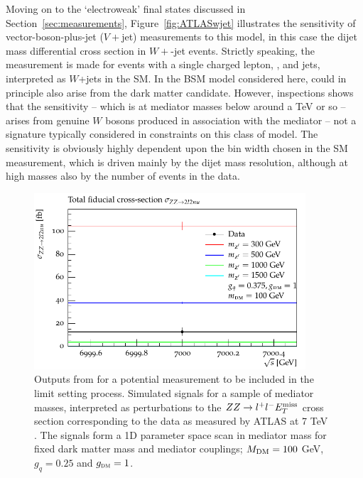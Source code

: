 \documentclass[floatfix]{article}
\begin{document}
Moving on to the `electroweak' final states discussed in Section~\ref{sec:measurements}, Figure~\ref{fig:ATLASwjet} illustrates the sensitivity of vector-boson-plus-jet
($V+$jet) measurements to this model, in this case the dijet mass differential cross section in $W+$-jet events. Strictly speaking, the measurement is made for
events with a single charged lepton, \MET, and jets, interpreted as $W$+jets in the SM. In the BSM model considered here, \MET could in principle 
also arise from the dark matter candidate. However, inspections shows that the sensitivity -- which is at mediator masses below around a TeV or so -- arises 
from genuine $W$ bosons produced in association with the mediator -- not a signature typically considered in constraints on this class of model. The sensitivity
is obviously highly dependent upon the bin width chosen in the SM measurement, which is driven mainly by the dijet mass resolution, although at high masses also by
the number of events in the data.

\begin{figure}
\centering
      \includegraphics[width=0.9\textwidth]{images/atlaszz/fullrange/ATLASZZ.pdf}
\caption{Outputs from \rivet for a potential measurement to be included in the limit setting process. Simulated signals for a 
sample of mediator masses, interpreted as perturbations to the $ZZ\rightarrow l^+l^- E_T^{\rm miss}$ cross section 
corresponding to the data as measured by ATLAS at 7 TeV~\cite{Aad:2012awa} \label{fig:ATLASzz}. The signals form a 1D parameter space scan in 
mediator mass \MZP for fixed dark matter mass and mediator couplings; $M_{\rm DM}=100$ GeV, $g_{q}=0.25$ and $g_{\textsc{dm}} = 1$.}
\label{fig:ATLASzz}
\end{figure}
\end{document}
